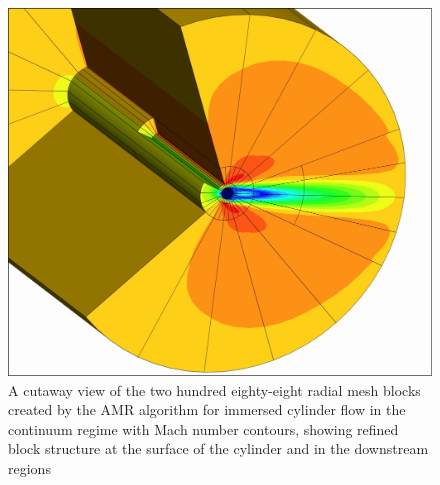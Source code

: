 \documentclass[titlepage,11pt,letterpaper]{article}
\begin{document}
%
\begin{figure}[t]
  \begin{center}
    \includegraphics[width=0.3\textheight]{./figs/AMR_mesh2.jpg}
    \caption{A cutaway view of the two hundred eighty-eight radial mesh blocks created by the 
      AMR algorithm for immersed cylinder flow in the continuum regime with Mach number contours, 
      showing refined block structure at the surface of the cylinder and in the downstream regions}
    \label{fig:cyl_AMR}
  \end{center}    
\end{figure}
%
\end{document}
